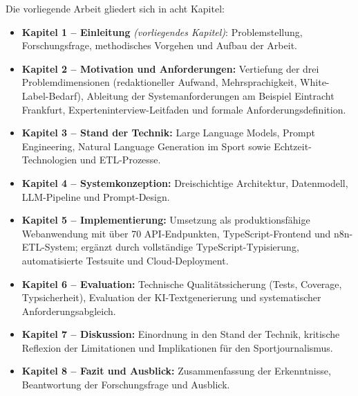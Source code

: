 Die vorliegende Arbeit gliedert sich in acht Kapitel:

\begin{itemize}
\tightlist
\item
  \textbf{Kapitel 1 -- Einleitung} \emph{(vorliegendes Kapitel)}:
  Problemstellung, Forschungsfrage, methodisches Vorgehen und Aufbau der
  Arbeit.
\item
  \textbf{Kapitel 2 -- Motivation und Anforderungen:} Vertiefung der
  drei Problemdimensionen (redaktioneller Aufwand, Mehrsprachigkeit,
  White-Label-Bedarf), Ableitung der Systemanforderungen am Beispiel
  Eintracht Frankfurt, Experteninterview-Leitfaden und formale
  Anforderungsdefinition.
\item
  \textbf{Kapitel 3 -- Stand der Technik:} Large Language Models, Prompt
  Engineering, Natural Language Generation im Sport sowie
  Echtzeit-Technologien und ETL-Prozesse.
\item
  \textbf{Kapitel 4 -- Systemkonzeption:} Dreischichtige Architektur,
  Datenmodell, LLM-Pipeline und Prompt-Design.
\item
  \textbf{Kapitel 5 -- Implementierung:} Umsetzung als produktionsfähige
  Webanwendung mit über 70 API-Endpunkten, TypeScript-Frontend und
  n8n-ETL-System; ergänzt durch vollständige TypeScript-Typisierung,
  automatisierte Testsuite und Cloud-Deployment.
\item
  \textbf{Kapitel 6 -- Evaluation:} Technische Qualitätssicherung
  (Tests, Coverage, Typsicherheit), Evaluation der KI-Textgenerierung
  und systematischer Anforderungsabgleich.
\item
  \textbf{Kapitel 7 -- Diskussion:} Einordnung in den Stand der Technik,
  kritische Reflexion der Limitationen und Implikationen für den
  Sportjournalismus.
\item
  \textbf{Kapitel 8 -- Fazit und Ausblick:} Zusammenfassung der
  Erkenntnisse, Beantwortung der Forschungsfrage und Ausblick.
\end{itemize}
